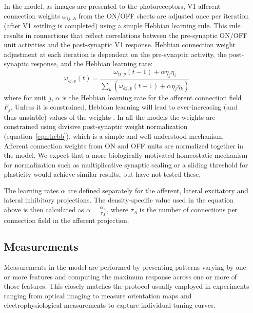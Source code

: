 In the model, as images are presented to
the photoreceptors, V1 afferent connection weights $\omega_{ij,A}$
from the ON/OFF sheets are adjusted once per iteration (after V1
settling is completed) using a simple Hebbian learning rule. This rule
results in connections that reflect correlations between the
pre-synaptic ON/OFF unit activities and the post-synaptic V1 response.
Hebbian connection weight adjustment at each iteration is dependent on
the pre-synaptic activity, the post-synaptic response, and the Hebbian
learning rate:
\begin{equation}
\omega_{ij,p}(t)=\frac{\omega_{ij,p}(t-1)+\alpha\eta_{j}\eta_{i}}{\sum_{k}\left(\omega_{kj,p}(t-1)+\alpha\eta_{j}\eta_{k}\right)}
\label{eqn:hebb}
\end{equation}
where for unit $j$, $\alpha$ is the Hebbian learning rate for the
afferent connection field $F_{j}$. Unless it is constrained, Hebbian
learning will lead to ever-increasing (and thus unstable) values of
the weights \citep{Rochester1956}. In all the models the weights are
constrained using divisive post-synaptic weight normalization
(equation~\ref{eqn:hebb}), which is a simple and well understood
mechanism. Afferent connection weights from ON and OFF units are
normalized together in the model. We expect that a more biologically
motivated homeostatic mechanism for normalization such as
multiplicative synaptic scaling
\citep{Turrigiano1999,Turrigiano2004,Sullivan2006} or a sliding
threshold for plasticity \citep{Bienenstock1982} would achieve similar
results, but have not tested these.

The learning rates $\alpha$ are defined separately for the afferent,
lateral excitatory and lateral inhibitory projections. The
density-specific value used in the equation above is then calculated
as $\alpha=\frac{\alpha_{A}}{\tau_{A}}$, where $\tau_{A}$ is the
number of connections per connection field in the afferent projection.


\subsection{Measurements}

Measurements in the model are performed by presenting patterns varying
by one or more features and computing the maximum response across one
or more of those features. This closely matches the protocol usually
employed in experiments ranging from optical imaging to measure
orientation maps and electrophysiological measurements to capture
individual tuning curves.

